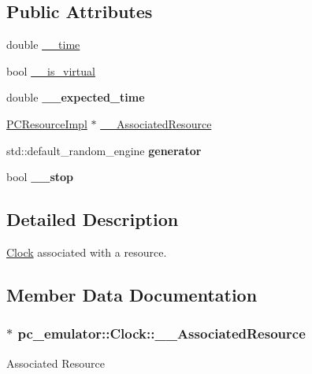 \subsection*{Public Attributes}
\begin{DoxyCompactItemize}
\item 
double \hyperlink{classpc__emulator_1_1Clock_ad9198c0f45039a5b22c1404bdd245679}{\+\_\+\+\_\+time}
\item 
bool \hyperlink{classpc__emulator_1_1Clock_a0f6af10c0d261885b85149902e273725}{\+\_\+\+\_\+is\+\_\+virtual}
\item 
double {\bfseries \+\_\+\+\_\+expected\+\_\+time}\hypertarget{classpc__emulator_1_1Clock_a7adf6bf1c1ad60171c37fc2e86932b12}{}\label{classpc__emulator_1_1Clock_a7adf6bf1c1ad60171c37fc2e86932b12}

\item 
\hyperlink{classpc__emulator_1_1PCResourceImpl}{P\+C\+Resource\+Impl} $\ast$ \hyperlink{classpc__emulator_1_1Clock_aba91d4760a2681b29264c021b519b10b}{\+\_\+\+\_\+\+Associated\+Resource}
\item 
std\+::default\+\_\+random\+\_\+engine {\bfseries generator}\hypertarget{classpc__emulator_1_1Clock_a927a6be645810abc1de58682d971fb6b}{}\label{classpc__emulator_1_1Clock_a927a6be645810abc1de58682d971fb6b}

\item 
bool {\bfseries \+\_\+\+\_\+stop}\hypertarget{classpc__emulator_1_1Clock_a15b76e38b0372e74a6fef571b700f8e4}{}\label{classpc__emulator_1_1Clock_a15b76e38b0372e74a6fef571b700f8e4}

\end{DoxyCompactItemize}


\subsection{Detailed Description}
\hyperlink{classpc__emulator_1_1Clock}{Clock} associated with a resource. 

\subsection{Member Data Documentation}
\subsubsection[{\texorpdfstring{\+\_\+\+\_\+\+Associated\+Resource}{__AssociatedResource}}]{$\ast$ pc\+\_\+emulator\+::\+Clock\+::\+\_\+\+\_\+\+Associated\+Resource}\hypertarget{classpc__emulator_1_1Clock_aba91d4760a2681b29264c021b519b10b}{}\label{classpc__emulator_1_1Clock_aba91d4760a2681b29264c021b519b10b}
Associated Resource 
